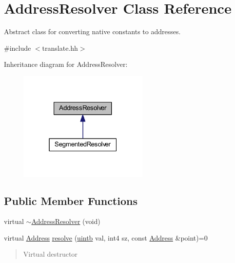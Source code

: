 \hypertarget{class_address_resolver}{}\section{Address\+Resolver Class Reference}
\label{class_address_resolver}


Abstract class for converting native constants to addresses.  




{\ttfamily \#include $<$translate.\+hh$>$}



Inheritance diagram for Address\+Resolver\+:
\nopagebreak
\begin{figure}[H]
\begin{center}
\leavevmode
\includegraphics[width=183pt]{class_address_resolver__inherit__graph}
\end{center}
\end{figure}
\subsection*{Public Member Functions}
\begin{DoxyCompactItemize}
\item 
virtual \mbox{\hyperlink{class_address_resolver_a31eb658deea94b4619c4c1bc4e11be06}{$\sim$\+Address\+Resolver}} (void)
\item 
virtual \mbox{\hyperlink{class_address}{Address}} \mbox{\hyperlink{class_address_resolver_a5ac794d1a7c5c8c678ac5fecdf0499ff}{resolve}} (\mbox{\hyperlink{types_8h_a2db313c5d32a12b01d26ac9b3bca178f}{uintb}} val, int4 sz, const \mbox{\hyperlink{class_address}{Address}} \&point)=0
\begin{DoxyCompactList}\small\item\em \begin{quote}
Virtual destructor\end{quote}
\end{DoxyCompactList}\end{DoxyCompactItemize}


